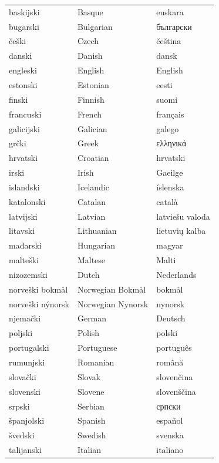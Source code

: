 \vspace*{-5mm}
\centering
  \setlength{\tabcolsep}{2em}
  \begin{tabulary}{170mm}{LLL} \toprule
  baskijski & Basque & euskara \\
  bugarski & Bulgarian & български \\
  češki & Czech & čeština \\
  danski & Danish & dansk \\
  engleski & English & English \\
  estonski & Estonian & eesti \\
  finski & Finnish & suomi \\
  francuski & French & français \\
  galicijski & Galician & galego \\
  grčki & Greek & ελληνικά \\
  hrvatski & Croatian & hrvatski \\
  irski & Irish & Gaeilge \\
  islandski & Icelandic & íslenska \\
  katalonski & Catalan & català \\
  latvijski & Latvian & latviešu valoda \\
  litavski & Lithuanian & lietuvių kalba \\
  mađarski & Hungarian & magyar \\
  malteški & Maltese & Malti \\
  nizozemski & Dutch & Nederlands \\
  norveški bokmål & Norwegian Bokmål & bokmål \\
  norveški nýnorsk & Norwegian Nynorsk & nynorsk \\
  njemački & German & Deutsch \\  
  poljski & Polish & polski \\
  portugalski & Portuguese & português \\
  rumunjski & Romanian & română \\
  slovački & Slovak & slovenčina \\
  slovenski & Slovene & slovenščina \\
  srpski & Serbian & српски \\
  španjolski & Spanish & español \\
  švedski & Swedish & svenska \\
  talijanski & Italian & italiano \\ \bottomrule
\end{tabulary}


